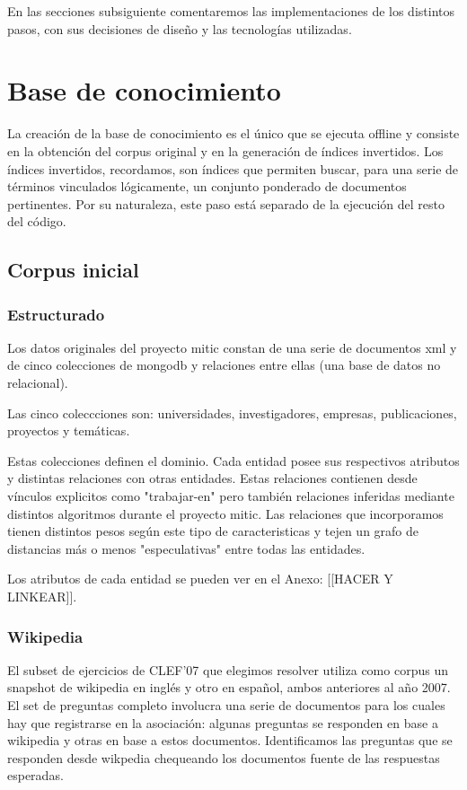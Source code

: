 En las secciones subsiguiente comentaremos las implementaciones de los
distintos pasos, con sus decisiones de dise\~no y las tecnolog\'ias
utilizadas. 


\bigskip

\section{Base de conocimiento}
\bigskip


La creaci\'on de la base de conocimiento es el \'unico que se ejecuta offline
y consiste en la obtención del corpus original y en la generación de índices
invertidos. Los índices invertidos, recordamos, son índices que permiten
buscar, para una serie de términos vinculados lógicamente, un conjunto
ponderado de documentos pertinentes. Por su naturaleza, este paso est\'a 
separado de la ejecuci\'on del resto del c\'odigo.

\subsection{Corpus inicial}

\subsubsection{Estructurado}
Los datos originales del proyecto mitic constan de una serie de documentos 
xml y de cinco colecciones de mongodb y relaciones entre ellas (una base de datos no relacional).

Las cinco coleccciones son: universidades, investigadores, empresas,
publicaciones, proyectos y tem\'aticas.

Estas colecciones definen el dominio. Cada entidad 
posee sus respectivos atributos y distintas relaciones con otras entidades.
Estas relaciones contienen desde vínculos explicitos como "trabajar-en"
pero también relaciones inferidas mediante distintos algoritmos durante el proyecto mitic.
Las relaciones que incorporamos tienen distintos pesos según este tipo de caracteristicas
y tejen un grafo de distancias más o menos "especulativas" entre todas las entidades.

Los atributos de cada entidad se pueden ver en el Anexo: [[HACER Y LINKEAR]].

\subsubsection{Wikipedia}
El subset de ejercicios de CLEF'07 que elegimos resolver
utiliza como corpus un snapshot de wikipedia en inglés y otro en español,
ambos anteriores al año 2007.
El set de preguntas completo involucra una serie de documentos para los cuales hay que 
registrarse en la asociación: algunas preguntas se responden en base a wikipedia y otras en base a estos documentos.
Identificamos las preguntas que se responden desde wikpedia chequeando los documentos fuente de las respuestas esperadas.

